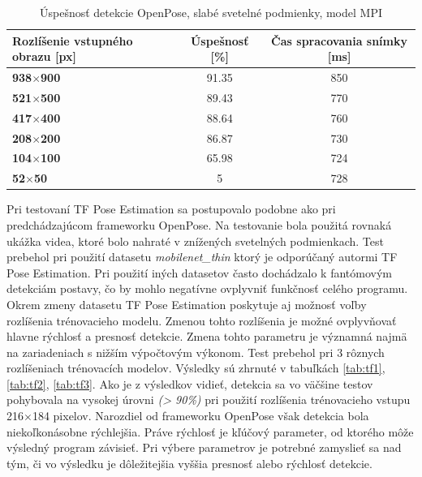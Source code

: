 \documentclass[slovak,master,dept460,male,cpp,cpdeclaration]{diploma}
\begin{document}
\begin{table}[H]
\begin{tabular}{|l|c|c|}
\hline
\textbf{Rozlíšenie vstupného obrazu [px]}        & \textbf{Úspešnosť [\%]}  & \textbf{Čas spracovania snímky [ms]} \\ \hline
\textbf{938$\times$900}      &   91.35         &   850        \\ \hline
\textbf{521$\times$500}      &   89.43         &   770        \\ \hline
\textbf{417$\times$400}      &   88.64         &   760        \\ \hline
\textbf{208$\times$200}      &   86.87         &   730        \\ \hline
\textbf{104$\times$100}      &   65.98         &   724        \\ \hline
\textbf{52$\times$50}       &   5             &   728        \\ \hline
\end{tabular}

	\caption{Úspešnosť detekcie OpenPose, slabé svetelné podmienky, model MPI }
	\label{tab:openpose2}
\end{table}


Pri testovaní TF Pose Estimation  sa postupovalo podobne ako pri predchádzajúcom frameworku OpenPose. Na testovanie bola použitá rovnaká ukážka videa, ktoré bolo nahraté v znížených svetelných podmienkach. Test prebehol pri použití datasetu \textit{mobilenet\_thin} ktorý je odporúčaný autormi TF Pose Estimation. Pri použití iných datasetov často dochádzalo k fantómovým detekciám postavy, čo by mohlo negatívne ovplyvniť funkčnosť celého programu. Okrem zmeny datasetu  TF Pose Estimation poskytuje aj možnosť voľby rozlíšenia  trénovacieho modelu. Zmenou tohto rozlíšenia je možné ovplyvňovať hlavne rýchlosť a presnosť detekcie. Zmena tohto parametru je významná najmä na zariadeniach s  nižším výpočtovým výkonom. Test prebehol pri 3 rôznych rozlíšeniach trénovacích modelov. Výsledky sú zhrnuté v tabuľkách \ref{tab:tf1}, \ref{tab:tf2}, \ref{tab:tf3}. Ako je z výsledkov vidieť, detekcia  sa vo väčšine testov pohybovala na vysokej úrovni \textit{(> 90\%)} pri použití  rozlíšenia trénovacieho vstupu  216$\times$184 pixelov.  Narozdiel od frameworku OpenPose však detekcia bola niekoľkonásobne rýchlejšia. Práve rýchlosť je kľúčový parameter,  od ktorého môže výsledný program závisieť. Pri výbere  parametrov je potrebné zamyslieť sa nad tým, či vo výsledku je dôležitejšia vyššia presnosť alebo rýchlosť detekcie.
\end{document}
